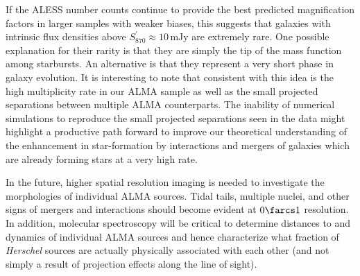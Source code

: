 \documentclass[iop]{emulateapj}
\begin{document}
If the ALESS number counts continue to provide the best predicted
magnification factors in larger samples with weaker biases, this suggests that
galaxies with intrinsic flux densities above $S_{870}^\prime \approx 10\,$mJy
are extremely rare.  One possible explanation for their rarity is that they are
simply the tip of the mass function among starbursts.  An alternative is that
they represent a very short phase in galaxy evolution.  It is interesting to
note that consistent with this idea is the high multiplicity rate in our ALMA
sample as well as the small projected separations between multiple ALMA
counterparts.  The inability of numerical simulations to reproduce the small
projected separations seen in the data might highlight a productive path
forward to improve our theoretical understanding of the enhancement in
star-formation by interactions and mergers of galaxies which are already
forming stars at a very high rate.

In the future, higher spatial resolution imaging is needed to investigate the
morphologies of individual ALMA sources.  Tidal tails, multiple nuclei, and
other signs of mergers and interactions should become evident at $0\farcs1$
resolution.  In addition, molecular spectroscopy will be critical to determine
distances to and dynamics of individual ALMA sources and hence characterize
what fraction of {\it Herschel} sources are actually physically associated with
each other (and not simply a result of projection effects along the line of
sight).  %
\end{document}
